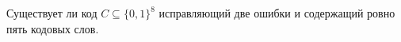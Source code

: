 Существует ли код $C \subseteq \{0, 1\}^8$ исправляющий две ошибки и содержащий ровно пять кодовых слов.